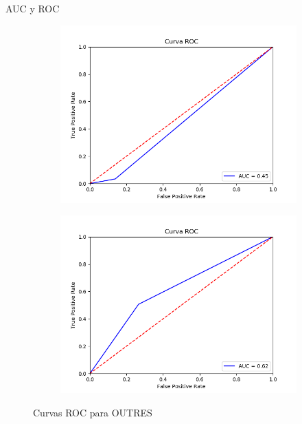 \documentclass[10pt]{beamer}
\begin{document}
\begin{frame}[fragile]{AUC y ROC}
\vspace{10px}

\begin{figure}[H]
	\centering
	\begin{subfigure}{.49\textwidth}
		\centering
		\includegraphics[scale=0.35]{Imagenes/roc/OUTRES_vertebral}
	\end{subfigure}
	\begin{subfigure}{.49\textwidth}
		\centering
		\includegraphics[scale=0.35]{Imagenes/roc/OUTRES_breastw}
	\end{subfigure}
	\caption*{Curvas ROC para OUTRES}
	\label{ROC_OUTRES}
\end{figure}

\end{frame}
\end{document}
